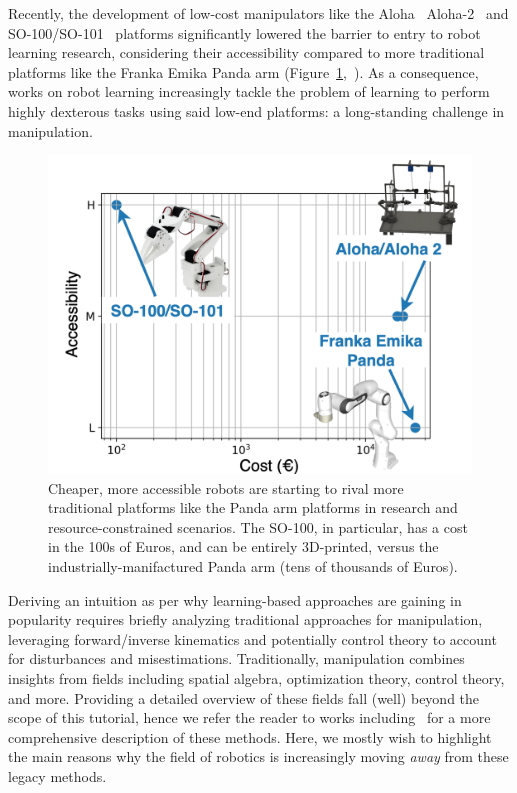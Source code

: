 Recently, the development of low-cost manipulators like the Aloha~\citep{zhaoLearningFineGrainedBimanual2023} Aloha-2~\citep{aldacoALOHA2Enhanced} and SO-100/SO-101~\citep{knightStandardOpenSO100} platforms significantly lowered the barrier to entry to robot learning research, considering their accessibility compared to more traditional platforms like the Franka Emika Panda arm (Figure~\ref{fig:robotic-platforms-costs},~\citep{knightStandardOpenSO100}). 
As a consequence, works on robot learning increasingly tackle the problem of learning to perform highly dexterous tasks using said low-end platforms: a long-standing challenge in manipulation.

\begin{figure}
    \centering
    \includegraphics[width=0.4\linewidth]{figures/ch2/ch2-cost-accessibility.png}
    \caption{Cheaper, more accessible robots are starting to rival more traditional platforms like the Panda arm platforms in research and resource-constrained scenarios. The SO-100, in particular, has a cost in the 100s of Euros, and can be entirely 3D-printed, versus the industrially-manifactured Panda arm (tens of thousands of Euros).}
    \label{fig:robotic-platforms-costs}
\end{figure}

Deriving an intuition as per why learning-based approaches are gaining in popularity requires briefly analyzing traditional approaches for manipulation, leveraging forward/inverse kinematics and potentially control theory to account for disturbances and misestimations.
Traditionally, manipulation combines insights from fields including spatial algebra, optimization theory, control theory, and more. 
Providing a detailed overview of these fields fall (well) beyond the scope of this tutorial, hence we refer the reader to works including~\citet{sicilianoSpringerHandbookRobotics2016, lynchModernRoboticsMechanics2017, tedrakeRoboticManipulationPerception, tedrakeUnderactuatedRoboticsAlgorithms} for a more comprehensive description of these methods.
Here, we mostly wish to highlight the main reasons why the field of robotics is increasingly moving \emph{away} from these legacy methods.

